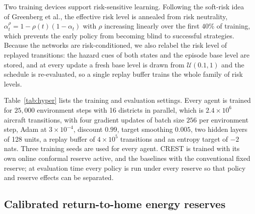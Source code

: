 Two training devices support risk-sensitive learning. Following the soft-risk idea of Greenberg et al.\cite{greenberg2022cesor}, the effective risk level is annealed from risk neutrality, $\alpha^\rho_t = 1-\rho(t)(1-\alpha_t)$ with $\rho$ increasing linearly over the first $40\%$ of training, which prevents the early policy from becoming blind to successful strategies. Because the networks are risk-conditioned, we also relabel the risk level of replayed transitions: the hazard cues of both states and the episode base level are stored, and at every update a fresh base level is drawn from $\mathcal{U}(0.1,1)$ and the schedule is re-evaluated, so a single replay buffer trains the whole family of risk levels.

Table~\ref{tab:hyper} lists the training and evaluation settings. Every agent is trained for $25{,}000$ environment steps with 16 districts in parallel, which is $2.4\times 10^6$ aircraft transitions, with four gradient updates of batch size $256$ per environment step, Adam at $3\times 10^{-4}$, discount $0.99$, target smoothing $0.005$, two hidden layers of 128 units, a replay buffer of $4\times 10^5$ transitions and an entropy target of $-2$ nats. Three training seeds are used for every agent. CREST is trained with its own online conformal reserve active, and the baselines with the conventional fixed reserve; at evaluation time every policy is run under every reserve so that policy and reserve effects can be separated.

\subsection*{Calibrated return-to-home energy reserves}

